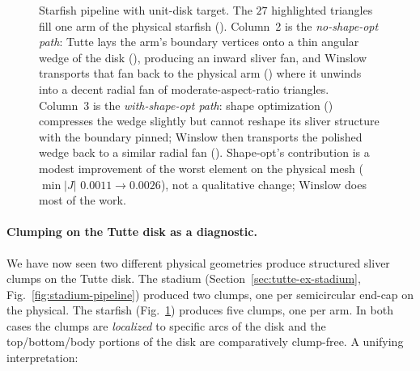 \documentclass[11pt]{article}
\begin{document}
\begin{figure}[htbp]
\begin{minipage}[c]{0.3\textwidth}
\begin{subfigure}{\textwidth}
    \end{subfigure}
  \end{minipage}
  \caption{Starfish pipeline with unit-disk target. The $27$
  highlighted triangles fill one arm of the physical starfish
  (). Column~2 is the
  \emph{no-shape-opt path}: Tutte lays the arm's boundary
  vertices onto a thin angular wedge of the disk
  (), producing an inward sliver fan, and
  Winslow transports that fan back to the physical arm
  () where it unwinds into a
  decent radial fan of moderate-aspect-ratio triangles.
  Column~3 is the \emph{with-shape-opt path}: shape optimization
  () compresses the wedge slightly but
  cannot reshape its sliver structure with the boundary pinned;
  Winslow then transports the polished wedge back to a similar
  radial fan (). Shape-opt's contribution
  is a modest improvement of the worst element on the physical
  mesh ($\min|J|$ $0.0011\!\to\!0.0026$), not a qualitative
  change; Winslow does most of the work.}
  \label{fig:star-pipeline}
\end{figure}

\paragraph{Clumping on the Tutte disk as a diagnostic.}
We have now seen two different physical geometries produce
structured sliver clumps on the Tutte disk. The stadium
(Section~\ref{sec:tutte-ex-stadium},
Fig.~\ref{fig:stadium-pipeline})
produced two clumps, one per semicircular end-cap on the
physical. The starfish
(Fig.~\ref{fig:star-pipeline}) produces
five clumps, one per arm. In both cases the clumps are
\emph{localized} to specific arcs of the disk and the
top/bottom/body portions of the disk are comparatively
clump-free. A unifying interpretation:
\end{document}
